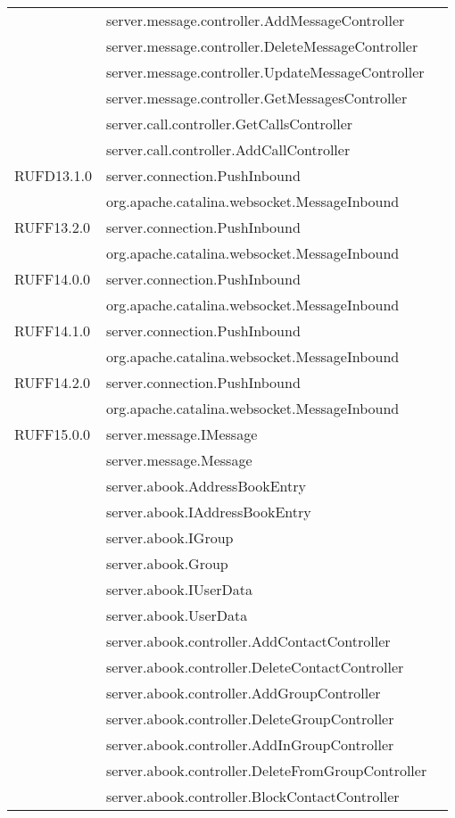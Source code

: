\begin{center}
\begin{longtable}{lp{}l}
& server.message.controller.AddMessageController\\
& server.message.controller.DeleteMessageController\\
& server.message.controller.UpdateMessageController\\
& server.message.controller.GetMessagesController\\
& server.call.controller.GetCallsController\\
& server.call.controller.AddCallController\\
RUFD13.1.0 & server.connection.PushInbound\\
& org.apache.catalina.websocket.MessageInbound\\
RUFF13.2.0 & server.connection.PushInbound\\
& org.apache.catalina.websocket.MessageInbound\\
RUFF14.0.0 & server.connection.PushInbound\\
& org.apache.catalina.websocket.MessageInbound\\
RUFF14.1.0 & server.connection.PushInbound\\
& org.apache.catalina.websocket.MessageInbound\\
RUFF14.2.0 & server.connection.PushInbound\\
& org.apache.catalina.websocket.MessageInbound\\
RUFF15.0.0 & server.message.IMessage\\
& server.message.Message\\
 & server.abook.AddressBookEntry\\
& server.abook.IAddressBookEntry\\
& server.abook.IGroup\\
& server.abook.Group\\
& server.abook.IUserData\\
& server.abook.UserData\\
& server.abook.controller.AddContactController\\
& server.abook.controller.DeleteContactController\\
& server.abook.controller.AddGroupController\\
& server.abook.controller.DeleteGroupController\\
& server.abook.controller.AddInGroupController\\
& server.abook.controller.DeleteFromGroupController\\
& server.abook.controller.BlockContactController\\

\end{longtable}
\end{center}
